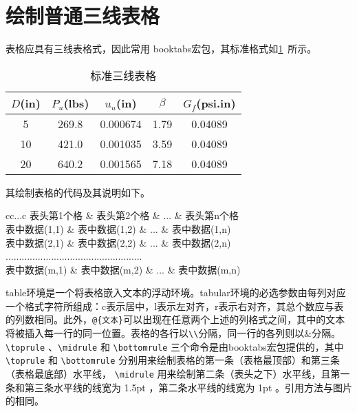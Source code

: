 \documentclass[withoutpreface,bwprint]{cumcmthesis} %
\numberwithin{equation}{subsection}
\begin{document}
\section{绘制普通三线表格}
表格应具有三线表格式，因此常用 booktabs宏包，其标准格式如\cref{tab:001}~所示。
\begin{table}[!htbp]
    \caption{标准三线表格}\label{tab:001} \centering
    \begin{tabular}{ccccc}
        \toprule[1.5pt]
        $D$(in) & $P_u$(lbs) & $u_u$(in) & $\beta$ & $G_f$(psi.in)\\
        \midrule[1pt]
        5 & 269.8 & 0.000674 & 1.79 & 0.04089\\
        10 & 421.0 & 0.001035 & 3.59 & 0.04089\\
        20 & 640.2 & 0.001565 & 7.18 & 0.04089\\
        \bottomrule[1.5pt]
    \end{tabular}
\end{table}

其绘制表格的代码及其说明如下。
\begin{tcode}
    \begin{table}[!htbp]
        \caption[标签名]{中文标题}
        \begin{tabular}{cc...c}
            \toprule[1.5pt]
            表头第1个格   & 表头第2个格   & ... & 表头第n个格  \\
            \midrule[1pt]
            表中数据(1,1) & 表中数据(1,2) & ... & 表中数据(1,n)\\
            表中数据(2,1) & 表中数据(2,2) & ... & 表中数据(2,n)\\
            ...................................................\\
            表中数据(m,1) & 表中数据(m,2) & ... & 表中数据(m,n)\\
            \bottomrule[1.5pt]
        \end{tabular}
    \end{table}
\end{tcode}

\bigskip

table环境是一个将表格嵌入文本的浮动环境。tabular环境的必选参数由每列对应一个格式字符所组成：c表示居中，l表示左对齐，r表示右对齐，其总个数应与表的列数相同。此外，\verb|@{文本}|可以出现在任意两个上述的列格式之间，其中的文本将被插入每一行的同一位置。表格的各行以\verb|\\|分隔，同一行的各列则以\&分隔。 \verb|\toprule| 、\verb|\midrule| 和 \verb|\bottomrule| 三个命令是由booktabs宏包提供的，其中 \verb|\toprule| 和 \verb|\bottomrule| 分别用来绘制表格的第一条（表格最顶部）和第三条（表格最底部）水平线， \verb|\midrule| 用来绘制第二条（表头之下）水平线，且第一条和第三条水平线的线宽为 1.5pt ，第二条水平线的线宽为 1pt 。引用方法与图片的相同。
\end{document}
